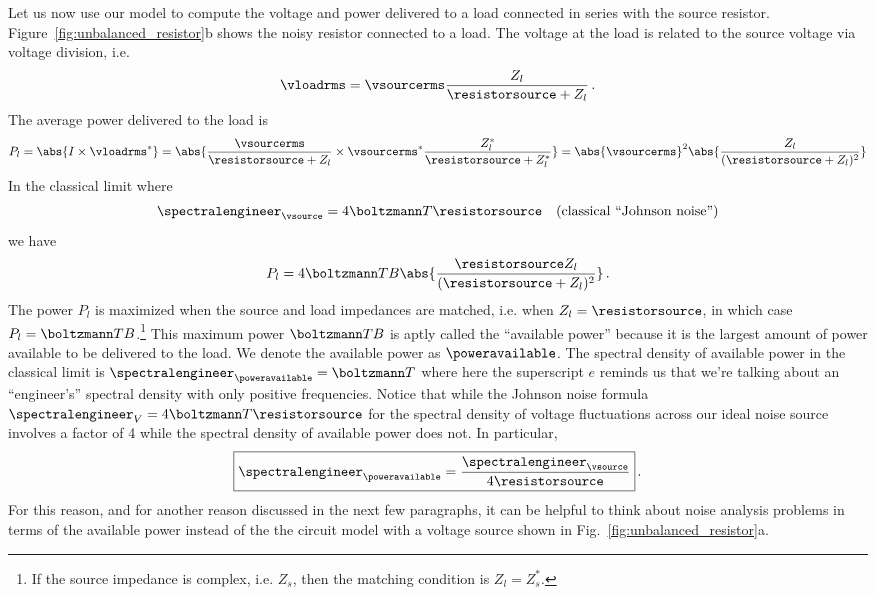 Let us now use our model to compute the voltage and power delivered to a load connected in series with the source resistor.
Figure~\ref{fig:unbalanced_resistor}b shows the noisy resistor connected to a load.
The voltage at the load is related to the source voltage via voltage division, i.e.
\begin{equation}
    \vloadrms = \vsourcerms \frac{Z_l}{\resistorsource + Z_l} \, .
\end{equation}
The average power delivered to the load is
\begin{equation}
  P_l
  = \abs{I \times \vloadrms^*}
  = \abs{
    \frac{\vsourcerms}{\resistorsource + Z_l}
    \times \vsourcerms^* \frac{Z_l^*}{\resistorsource + Z_l^*}}
  = \abs{\vsourcerms}^2 \abs{\frac{Z_l}{(\resistorsource + Z_l)^2}}
  \nonumber
\end{equation}
In the classical limit where
\begin{equation}
  \spectralengineer_{\vsource} = 4 \boltzmann T \resistorsource \quad \text{(classical ``Johnson noise'')}
\end{equation}
we have
\begin{equation}
  P_l = 4 \boltzmann T B \abs{\frac{\resistorsource Z_l}{(\resistorsource + Z_l)^2}} \label{eq:available_power_unenlightening}
  \, .
\end{equation}
The power $P_l$ is maximized when the source and load impedances are matched, i.e. when $Z_l = \resistorsource$, in which case $P_l = \boltzmann T B$.\footnote{If the source impedance is complex, i.e. $Z_s$, then the matching condition is $Z_l = Z_s^*$.}
This maximum power $\boltzmann T B$ is aptly called the ``available power'' because it is the largest amount of power available to be delivered to the load.
We denote the available power as $\poweravailable$.
The spectral density of available power in the classical limit is $\spectralengineer_{\poweravailable} = \boltzmann T$ where here the superscript $e$ reminds us that we're talking about an ``engineer's'' spectral density with only positive frequencies.
Notice that while the Johnson noise formula $\spectralengineer_V = 4 \boltzmann T \resistorsource$ for the spectral density of voltage fluctuations across our ideal noise source involves a factor of 4 while the spectral density of available power does not.
In particular,
\begin{equation}
  \boxed{
    \spectralengineer_{\poweravailable} = \frac{\spectralengineer_{\vsource}}{4 \resistorsource}
  } \label{eq:power_available_versus_source_voltage}
  \, .
\end{equation}
For this reason, and for another reason discussed in the next few paragraphs, it can be helpful to think about noise analysis problems in terms of the available power instead of the the circuit model with a voltage source shown in Fig.~\ref{fig:unbalanced_resistor}a.

